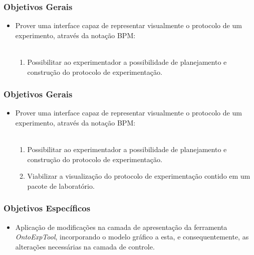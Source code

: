 \documentclass[aspectratio=169]{beamer}
\begin{document}
\begin{frame}
\frametitle{Objetivos Gerais}
\justifying

\begin{itemize}
\item Prover uma interface capaz de representar visualmente o protocolo de um experimento, através da notação BPM:
\\~\\
\begin{enumerate}
\item Possibilitar ao experimentador a possibilidade de planejamento e construção do protocolo de experimentação.
\end{enumerate}
\end{itemize}
\end{frame}

\begin{frame}
\frametitle{Objetivos Gerais}
\justifying

\begin{itemize}
\item Prover uma interface capaz de representar visualmente o protocolo de um experimento, através da notação BPM:
\\~\\
\begin{enumerate}
\item Possibilitar ao experimentador a possibilidade de planejamento e construção do protocolo de experimentação.
\item Viabilizar a visualização do protocolo de experimentação contido em um pacote de laboratório.
\end{enumerate}
\end{itemize}
\end{frame}

\begin{frame}
\frametitle{Objetivos Específicos}
\justifying
\begin{itemize}
\item Aplicação de modificações na camada de apresentação da ferramenta \textit{OntoExpTool}, incorporando o modelo gráfico a esta, e consequentemente, as alterações necessárias na camada de controle.
\end{itemize}

\end{frame}
\end{document}
